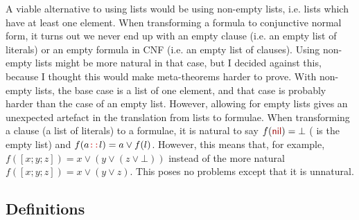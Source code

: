 \documentclass{article}
\begin{document}
A viable alternative to using lists would be using non-empty lists, i.e. lists which have at least one element. When transforming a formula to conjunctive normal form, it turns out we never end up with an empty clause (i.e. an empty list of literals) or an empty formula in CNF (i.e. an empty list of clauses). Using non-empty lists might be more natural in that case, but I decided against this, because I thought this would make meta-theorems harder to prove. With non-empty lists, the base case is a list of one element, and that case is probably harder than the case of an empty list. However, allowing for empty lists gives an unexpected artefact in the translation from lists to formulae. When transforming a clause (a list of literals) to a formulae, it is natural to say $f(\coqdocconstructor{nil})=\bot$ ( is the empty list) and $f(a\coqdocnotation{::}l)=a\vee f(l)$. However, this means that, for example, $f([x;y;z])=x\vee (y\vee(z\vee\bot))$ instead of the more natural $f([x;y;z])=x\vee (y\vee z)$. This poses no problems except that it is unnatural.

\subsection{Definitions}\label{sec_complete_defs}
\end{document}
